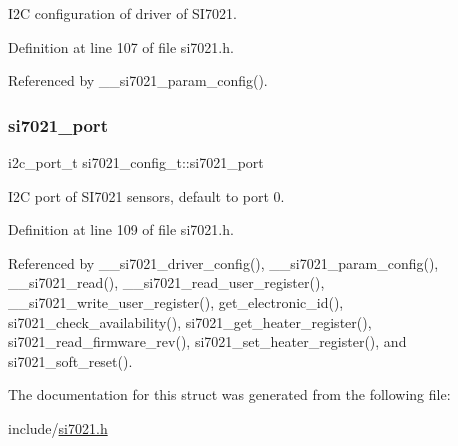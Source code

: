 I2C configuration of driver of S\+I7021. 

Definition at line 107 of file si7021.\+h.



Referenced by \+\_\+\+\_\+si7021\+\_\+param\+\_\+config().

\mbox{\label{structsi7021__config__t_ac3b2711d602d8210c52ec5d8680c827f}} 
\subsubsection{\texorpdfstring{si7021\+\_\+port}{si7021\_port}}
{\footnotesize\ttfamily i2c\+\_\+port\+\_\+t si7021\+\_\+config\+\_\+t\+::si7021\+\_\+port}

I2C port of S\+I7021 sensors, default to port 0. 

Definition at line 109 of file si7021.\+h.



Referenced by \+\_\+\+\_\+si7021\+\_\+driver\+\_\+config(), \+\_\+\+\_\+si7021\+\_\+param\+\_\+config(), \+\_\+\+\_\+si7021\+\_\+read(), \+\_\+\+\_\+si7021\+\_\+read\+\_\+user\+\_\+register(), \+\_\+\+\_\+si7021\+\_\+write\+\_\+user\+\_\+register(), get\+\_\+electronic\+\_\+id(), si7021\+\_\+check\+\_\+availability(), si7021\+\_\+get\+\_\+heater\+\_\+register(), si7021\+\_\+read\+\_\+firmware\+\_\+rev(), si7021\+\_\+set\+\_\+heater\+\_\+register(), and si7021\+\_\+soft\+\_\+reset().



The documentation for this struct was generated from the following file\+:\begin{DoxyCompactItemize}
\item 
include/\hyperlink{si7021_8h}{si7021.\+h}\end{DoxyCompactItemize}
